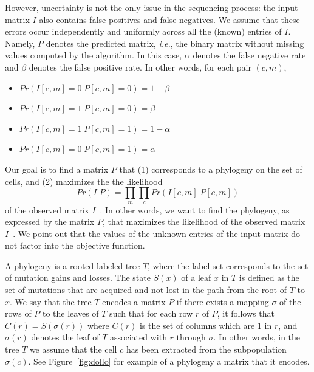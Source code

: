 \documentclass[a4paper,USenglish]{article}
\newcommand{\ie}{\emph{i.e.}}
\theoremstyle{definition}
\begin{document}
However, uncertainty is not the only issue in the sequencing process:
the input matrix $I$ also contains false positives and false
negatives.  We assume that these errors occur independently and
uniformly across all the (known) entries of $I$.  Namely, $P$ denotes
the predicted matrix, \ie, the binary matrix without missing values
computed by the algorithm.  In this case, $\alpha$ denotes the false
negative rate and $\beta$ denotes the false positive rate.  In other
words, for each pair $(c,m)$,
\begin{itemize}
\item $Pr(I[c,m] = 0|P[c,m] = 0) = 1- \beta$
\item $Pr(I[c,m] = 1|P[c,m] = 0) = \beta$
\item $Pr(I[c,m] = 1|P[c,m] = 1) = 1- \alpha$
\item $Pr(I[c,m] = 0|P[c,m] = 1) = \alpha$
\end{itemize}

Our goal is to find a matrix $P$ that (1) corresponds to a phylogeny
on the set of cells, and (2) maximizes the the likelihood
$$
Pr(I|P) = \prod_{m} \prod_{c} Pr(I[c,m] | P[c,m])
$$
of the observed matrix $I$~\cite{Jahn2016}.  In other words, we want
to find the phylogeny, as expressed by the matrix $P$, that maximizes
the likelihood of the observed matrix $I$~\cite{Jahn2016}.  We point
out that the values of the unknown entries of the input matrix do not
factor into the objective function.

A phylogeny is a rooted labeled tree $T$, where the label set
corresponds to the set of mutation gains and losses.  The state $S(x)$
of a leaf $x$ in $T$ is defined as the set of mutations that are
acquired and not lost in the path from the root of $T$ to $x$.  We say
that the tree $T$ encodes a matrix $P$ if there exists a mapping
$\sigma$ of the rows of $P$ to the leaves of $T$ such that for each
row $r$ of $P$, it follows that $C(r)=S(\sigma(r))$ where $C(r)$ is
the set of columns which are 1 in $r$, and $\sigma(r)$ denotes the
leaf of $T$ associated with $r$ through $\sigma$.  In other words, in
the tree $T$ we assume that the cell $c$ has been extracted from the
subpopulation $\sigma(c)$.  See Figure~\ref{fig:dollo} for example of
a phylogeny a matrix that it encodes.
\end{document}

